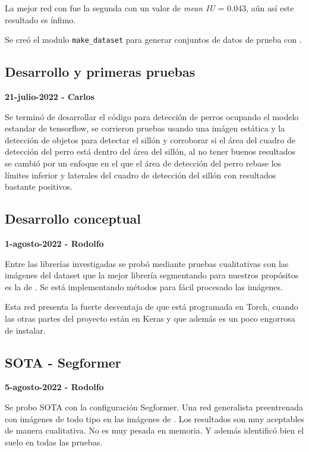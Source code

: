 La mejor red con fue la segunda con un valor de \textit{mean IU} = 0.043, aún así este resultado es ínfimo.


Se creó el modulo  \texttt{make\_dataset} para generar conjuntos de datos de prueba con \textcite{unity2022}.


\subsection*{Desarrollo y primeras pruebas}

\textbf{21-julio-2022 - Carlos}

Se terminó de desarrollar el código para detección de perros ocupando el modelo estandar de tensorflow, se corrieron pruebas usando una imágen estática y la detección de objetos para detectar el sillón y corroborar si el área
del cuadro de detección del perro está dentro del área del sillón, al no tener buenos resultados se cambió por un enfoque en el que el área de detección del perro rebase los límites inferior y laterales del
cuadro de detección del sillón con resultados bastante positivos.


\subsection*{Desarrollo conceptual}


\textbf{1-agosto-2022 - Rodolfo}

Entre las librerías investigadas se probó mediante pruebas cualitativas con las imágenes del dataset que la mejor librería segmentando para nuestros propósitos es la de \textcite{aung2022}. Se está implementando métodos para fácil procesado las imágenes. 

Esta red presenta la fuerte desventaja de que está programada en Torch, cuando las otras partes del proyecto están en Keras y que además es un poco engorrosa de instalar.


\subsection*{SOTA - Segformer}

\textbf{5-agosto-2022 - Rodolfo}

Se probo SOTA con la configuración Segformer. Una red generalista preentrenada con imágenes de todo tipo en las imágenes de \textcite{unity2022}. Los resultados son muy aceptables de manera cualitativa. No es muy pesada en memoria. Y además identificó bien el suelo en todas las pruebas.



